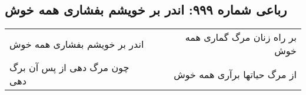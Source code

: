 \begin{center}
\section*{رباعی شماره ۹۹۹: اندر بر خویشم بفشاری همه خوش}
\label{sec:0999}
\begin{longtable}{l p{0.5cm} r}
اندر بر خویشم بفشاری همه خوش
&&
بر راه زنان مرگ گماری همه خوش
\\
چون مرگ دهی از پس آن برگ دهی
&&
از مرگ حیاتها برآری همه خوش
\\
\end{longtable}
\end{center}
